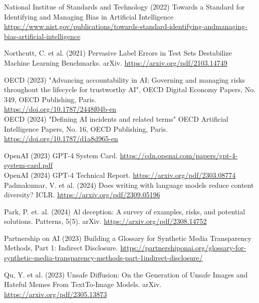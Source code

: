 \documentclass[10pt]{article}
\begin{document}
National Institue of Standards and Technology (2022) Towards a Standard for Identifying and Managing Bias in Artificial Intelligence \href{https://www.nist.gov/publications/towards-standard-identifying-andmanaging-bias-artificial-intelligence}{https://www.nist.gov/publications/towards-standard-identifying-andmanaging-bias-artificial-intelligence}

Northcutt, C. et al. (2021) Pervasive Label Errors in Test Sets Destabilize Machine Learning Benchmarks. arXiv. \href{https://arxiv.org/pdf/2103.14749}{https://arxiv.org/pdf/2103.14749}

OECD (2023) "Advancing accountability in AI: Governing and managing risks throughout the lifecycle for trustworthy AI", OECD Digital Economy Papers, No. 349, OECD Publishing, Paris.\\
\href{https://doi.org/10.1787/2448f04b-en}{https://doi.org/10.1787/2448f04b-en}\\
OECD (2024) "Defining AI incidents and related terms" OECD Artificial Intelligence Papers, No. 16, OECD Publishing, Paris. \href{https://doi.org/10.1787/d1a8d965-en}{https://doi.org/10.1787/d1a8d965-en}

OpenAI (2023) GPT-4 System Card. \href{https://cdn.openai.com/papers/gpt-4-system-card.pdf}{https://cdn.openai.com/papers/gpt-4-system-card.pdf}\\
OpenAI (2024) GPT-4 Technical Report. \href{https://arxiv.org/pdf/2303.08774}{https://arxiv.org/pdf/2303.08774}\\
Padmakumar, V. et al. (2024) Does writing with language models reduce content diversity? ICLR. \href{https://arxiv.org/pdf/2309.05196}{https://arxiv.org/pdf/2309.05196}

Park, P. et. al. (2024) Al deception: A survey of examples, risks, and potential solutions. Patterns, 5(5). arXiv. \href{https://arxiv.org/pdf/2308.14752}{https://arxiv.org/pdf/2308.14752}

Partnership on AI (2023) Building a Glossary for Synthetic Media Transparency Methods, Part 1: Indirect Disclosure. \href{https://partnershiponai.org/glossary-for-synthetic-media-transparency-methods-part-1indirect-disclosure/}{https://partnershiponai.org/glossary-for-synthetic-media-transparency-methods-part-1indirect-disclosure/}

Qu, Y. et al. (2023) Unsafe Diffusion: On the Generation of Unsafe Images and Hateful Memes From TextTo-Image Models. arXiv. \href{https://arxiv.org/pdf/2305.13873}{https://arxiv.org/pdf/2305.13873}
\end{document}
